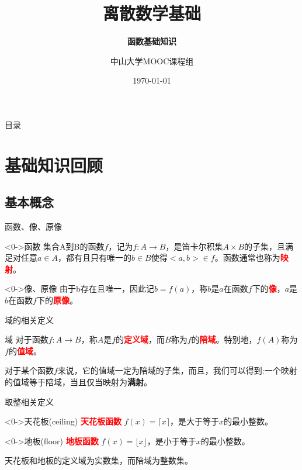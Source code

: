 \documentclass[xetex,10pt,aspectratio=43]{beamer}
\title{离散数学基础}
\subtitle{\fontsize{9pt}{14pt}\textbf{函数基础知识}}
\author{中山大学MOOC课程组}
\institute{\fontsize{8pt}{14pt}中山大学计算机学院}
\date{\today}
\begin{document}

\frame{\titlepage}

\section[目录]{}   %
\begin{frame}{目录}
\tableofcontents
\end{frame}

\section{基础知识回顾}

\subsection{基本概念}

\begin{frame}{函数、像、原像}
	\begin{block}<0->{函数}
		集合A到B的函数$f$，记为$f:A\rightarrow B$，是笛卡尔积集$A\times B$的子集，且满足对任意$a\in A$，都有且只有唯一的$b\in B$使得$<a,b>\in f$。函数通常也称为\textcolor{red}{\textbf{映射}}。
	\end{block}

	\begin{block}<0->{像、原像}
		由于b存在且唯一，因此记$b=f(a)$，称$b$是$a$在函数$f$下的\textcolor{red}{\textbf{像}}，$a$是$b$在函数$f$下的\textcolor{red}{\textbf{原像}}。
	\end{block}
\end{frame}

\begin{frame}{域的相关定义}
	\begin{block}{域}
		对于函数$f:A\rightarrow B$，称$A$是$f$的\textcolor{red}{\textbf{定义域}}，而$B$称为$f$的\textcolor{red}{\textbf{陪域}}。特别地，$f(A)$称为$f$的\textcolor{red}{\textbf{值域}}。
	\end{block}
	
	\textcolor{mymauve}{对于某个函数$f$来说，它的值域一定为陪域的子集，而且，我们可以得到:一个映射的值域等于陪域，当且仅当映射为\textbf{满射}。}

\end{frame}

\begin{frame}{取整相关定义}
	\begin{block}<0->{天花板(ceiling)}
		\textcolor{red}{\textbf{天花板函数}} $f(x) = \lceil x \rceil$，是大于等于$x$的最小整数。
	\end{block}
	
	\begin{block}<0->{地板(floor)}
		\textcolor{red}{\textbf{地板函数}} $f(x) = \lfloor x \rfloor$，是小于等于$x$的最小整数。
	\end{block}

	\textcolor{mymauve}{天花板和地板的定义域为实数集，而陪域为整数集。}
\end{frame}
\end{document}
